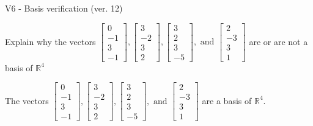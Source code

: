 \begin{exercise}
  \begin{exerciseTitle}V6 - Basis verification (ver. 12)\end{exerciseTitle}
  \begin{exerciseStatement}
    Explain why the vectors \(\left[\begin{array}{r}
0 \\
-1 \\
3 \\
-1
\end{array}\right] , \left[\begin{array}{r}
3 \\
-2 \\
3 \\
2
\end{array}\right] , \left[\begin{array}{r}
3 \\
2 \\
3 \\
-5
\end{array}\right] , \text{ and } \left[\begin{array}{r}
2 \\
-3 \\
3 \\
1
\end{array}\right]\) are or are not a basis of \(\mathbb{R}^4\)	


  \end{exerciseStatement}
  \begin{exerciseAnswer}
   The vectors \(\left[\begin{array}{r}
0 \\
-1 \\
3 \\
-1
\end{array}\right] , \left[\begin{array}{r}
3 \\
-2 \\
3 \\
2
\end{array}\right] , \left[\begin{array}{r}
3 \\
2 \\
3 \\
-5
\end{array}\right] , \text{ and } \left[\begin{array}{r}
2 \\
-3 \\
3 \\
1
\end{array}\right]\) 
  	 are  a basis of \(\mathbb{R}^4\).
  


  \end{exerciseAnswer}
\end{exercise}